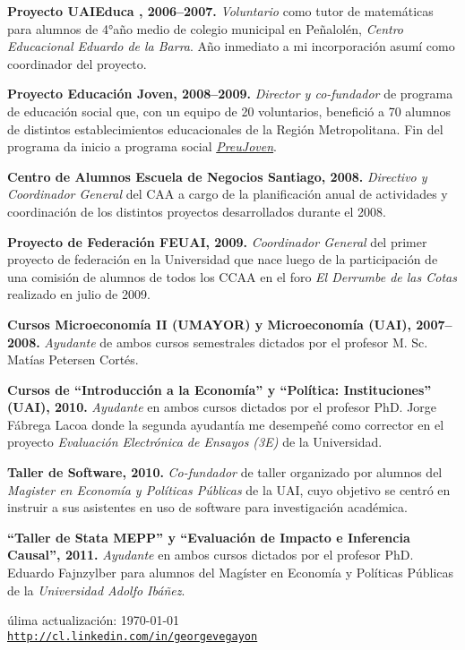 \documentclass[letterpaper, 12pt]{article}
\def\footerlink{http://cl.linkedin.com/in/georgevegayon}
\renewenvironment{itemize}{
  \begin{list}{}{
    \setlength{\leftmargin}{0.45cm}
  }
}{
  \end{list}
}
\begin{document}
\begin{itemize}
\item \textbf{Proyecto UAIEduca , 2006--2007.} \emph{Voluntario} como tutor de matemáticas para alumnos de 4°año medio de colegio municipal en Peñalolén, \emph{Centro Educacional Eduardo de la Barra}. Año inmediato a mi incorporación asumí como coordinador del proyecto.
\item \textbf{Proyecto Educación Joven, 2008--2009.} \emph{Director y co-fundador} de programa de educación social que, con un equipo de 20 voluntarios, benefició a 70 alumnos de distintos establecimientos educacionales de la Región Metropolitana. Fin del programa da inicio a programa social \href{http://www.preujoven.cl}{\emph {PreuJoven}}.
\item \textbf{Centro de Alumnos Escuela de Negocios Santiago, 2008.} \emph{Directivo y Coordinador General} del CAA a cargo de la planificación anual de actividades y coordinación de los distintos proyectos desarrollados durante el 2008.
\item \textbf{Proyecto de Federación FEUAI, 2009.} \emph{Coordinador General} del primer proyecto de federación en la Universidad que nace luego de la participación de una comisión de alumnos de todos los CCAA en el foro \emph{El Derrumbe de las Cotas} realizado en julio de 2009.
\item \textbf{Cursos Microeconomía II (UMAYOR) y Microeconomía (UAI), 2007--2008.} \emph{Ayudante} de ambos cursos semestrales dictados por el profesor M. Sc. Matías Petersen Cortés.
\item \textbf{Cursos de ``Introducción a la Economía'' y ``Política: Instituciones'' (UAI), 2010.} \emph{Ayudante} en ambos cursos dictados por el profesor PhD. Jorge Fábrega Lacoa donde la segunda ayudantía me desempeñé como corrector en el proyecto \emph{Evaluación Electrónica de Ensayos (3E)} de la Universidad.
\item \textbf{Taller de Software, 2010.} \emph{Co-fundador} de taller organizado por alumnos del \emph{Magister en Economía y Políticas Públicas} de la UAI, cuyo objetivo se centró en instruir a sus asistentes en uso de software para investigación académica.
\item \textbf{``Taller de Stata MEPP'' y ``Evaluaci\'on de Impacto e Inferencia Causal'', 2011.} \emph{Ayudante} en ambos cursos dictados por el profesor PhD. Eduardo Fajnzylber para alumnos del Magíster en Economía y Políticas Públicas de la \emph{Universidad Adolfo Ibáñez}.
\end{itemize}

\bigskip

\begin{center}
  \begin{footnotesize}
    úlima actualización: \today \\
    \href{\footerlink}{\texttt{\footerlink}}
  \end{footnotesize}
\end{center}
\end{document}
